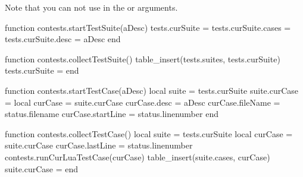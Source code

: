 
\startchapter[title=Unit Test Suites]

Note that you can not use  in the \type{\startTestSuite} or 
\type{\startTestCase} arguments. 

\startMkIVCode

\def\startTestSuite[#1]{%
  \startsubsection[title=Test Suite: #1]
  \directlua{thirddata.contests.startTestSuite("#1")}
}

\def\stopTestSuite{%
  \stopsubsection%
  \directlua{thirddata.contests.collectTestSuite()}
}

\def\startTestCase[#1]{%
  \startsubsubsection[title=Test Case: #1]
  \directlua{thirddata.contests.startTestCase("#1")}
}

\def\stopTestCase{%
  \stopsubsubsection%
  \directlua{thirddata.contests.collectTestCase()}
}

\stopMkIVCode

\startLuaCode

function contests.startTestSuite(aDesc)
  tests.curSuite       = {}
  tests.curSuite.cases = {}
  tests.curSuite.desc  = aDesc
end

function contests.collectTestSuite()
  table_insert(tests.suites, tests.curSuite)
  tests.curSuite = {}
end

function contests.startTestCase(aDesc)
  local suite       = tests.curSuite
  suite.curCase     = {}
  local curCase     = suite.curCase
  curCase.desc      = aDesc
  curCase.fileName  = status.filename
  curCase.startLine = status.linenumber
end

function contests.collectTestCase()
  local suite      = tests.curSuite
  local curCase    = suite.curCase
  curCase.lastLine = status.linenumber
  contests.runCurLuaTestCase(curCase)
  table_insert(suite.cases, curCase)
  suite.curCase    = {}
end

\stopLuaCode

\stopchapter